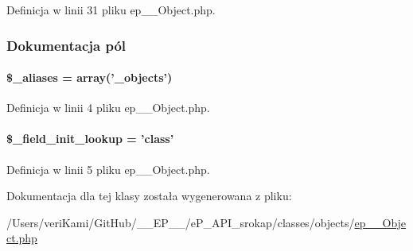 Definicja w linii 31 pliku ep\-\_\-\-\_\-\-Object.\-php.



\subsubsection{Dokumentacja pól}
\hypertarget{classep_____object_ab4e31d75f0bc5d512456911e5d01366b}{
\paragraph[{\$\-\_\-aliases}]{\setlength{\rightskip}{0pt plus 5cm}\$\-\_\-aliases = array('\-\_\-objects')}}\label{classep_____object_ab4e31d75f0bc5d512456911e5d01366b}


Definicja w linii 4 pliku ep\-\_\-\-\_\-\-Object.\-php.

\hypertarget{classep_____object_a4a4d54ae35428077a7c61ec8a5139af3}{
\paragraph[{\$\-\_\-field\-\_\-init\-\_\-lookup}]{\setlength{\rightskip}{0pt plus 5cm}\$\-\_\-field\-\_\-init\-\_\-lookup = 'class'}}\label{classep_____object_a4a4d54ae35428077a7c61ec8a5139af3}


Definicja w linii 5 pliku ep\-\_\-\-\_\-\-Object.\-php.



Dokumentacja dla tej klasy została wygenerowana z pliku\-:\begin{DoxyCompactItemize}
\item 
/\-Users/veri\-Kami/\-Git\-Hub/\-\_\-\-\_\-\-E\-P\-\_\-\-\_\-/e\-P\-\_\-\-A\-P\-I\-\_\-srokap/classes/objects/\hyperlink{ep_____object_8php}{ep\-\_\-\-\_\-\-Object.\-php}\end{DoxyCompactItemize}
